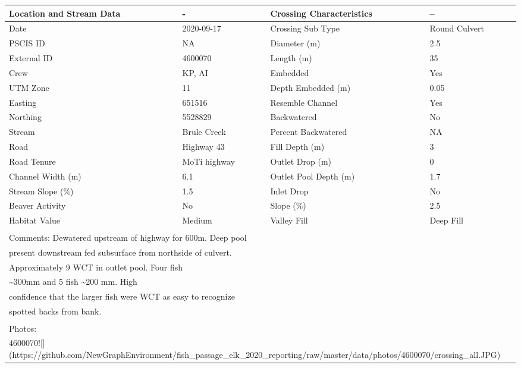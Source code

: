 \documentclass[
]{book}
\begin{document}
\begin{tabular}{l|l|l|l}
\hline
Location and Stream Data & - & Crossing Characteristics & --\\
\hline
Date & 2020-09-17 & Crossing Sub Type & Round Culvert\\
\hline
PSCIS ID & NA & Diameter (m) & 2.5\\
\hline
External ID & 4600070 & Length (m) & 35\\
\hline
Crew & KP, AI & Embedded & Yes\\
\hline
UTM Zone & 11 & Depth Embedded (m) & 0.05\\
\hline
Easting & 651516 & Resemble Channel & Yes\\
\hline
Northing & 5528829 & Backwatered & No\\
\hline
Stream & Brule Creek & Percent Backwatered & NA\\
\hline
Road & Highway 43 & Fill Depth (m) & 3\\
\hline
Road Tenure & MoTi highway & Outlet Drop (m) & 0\\
\hline
Channel Width (m) & 6.1 & Outlet Pool Depth (m) & 1.7\\
\hline
Stream Slope (\%) & 1.5 & Inlet Drop & No\\
\hline
Beaver Activity & No & Slope (\%) & 2.5\\
\hline
Habitat Value & Medium & Valley Fill & Deep Fill\\
\hline
\multicolumn{4}{l}{\textsuperscript{} Comments: Dewatered upstream of highway for 600m. Deep pool}\\
\multicolumn{4}{l}{present downstream fed subsurface from northside of culvert.}\\
\multicolumn{4}{l}{Approximately 9 WCT in outlet pool.  Four fish}\\
\multicolumn{4}{l}{\textasciitilde{}300mm and 5 fish \textasciitilde{}200 mm. High}\\
\multicolumn{4}{l}{confidence that the larger fish were WCT as easy to recognize}\\
\multicolumn{4}{l}{spotted backs from bank.}\\
\multicolumn{4}{l}{\textsuperscript{} Photos:}\\
\multicolumn{4}{l}{4600070![](https://github.com/NewGraphEnvironment/fish\_passage\_elk\_2020\_reporting/raw/master/data/photos/4600070/crossing\_all.JPG)}\\
\end{tabular}
\end{document}
